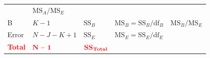 \documentclass[]{book}
\theoremstyle{definition}
\theoremstyle{definition}
\theoremstyle{remark}
\begin{document}
\begin{longtable}[]{@{}lllll@{}}
\begin{minipage}[t]{0.18\columnwidth}
\end{minipage} & \begin{minipage}[t]{0.12\columnwidth}\raggedright\strut
\(\text{MS}_A/\text{MS}_E\)\strut
\end{minipage}\tabularnewline
\begin{minipage}[t]{0.17\columnwidth}\raggedright\strut
B\strut
\end{minipage} & \begin{minipage}[t]{0.18\columnwidth}\raggedright\strut
\(K-1\)\strut
\end{minipage} & \begin{minipage}[t]{0.21\columnwidth}\raggedright\strut
\(\text{SS}_B\)\strut
\end{minipage} & \begin{minipage}[t]{0.18\columnwidth}\raggedright\strut
\(\text{MS}_B=\text{SS}_B/\text{df}_B\)\strut
\end{minipage} & \begin{minipage}[t]{0.12\columnwidth}\raggedright\strut
\(\text{MS}_B/\text{MS}_E\)\strut
\end{minipage}\tabularnewline
\begin{minipage}[t]{0.17\columnwidth}\raggedright\strut
Error\strut
\end{minipage} & \begin{minipage}[t]{0.18\columnwidth}\raggedright\strut
\(N-J-K+1\)\strut
\end{minipage} & \begin{minipage}[t]{0.21\columnwidth}\raggedright\strut
\(\text{SS}_E\)\strut
\end{minipage} & \begin{minipage}[t]{0.18\columnwidth}\raggedright\strut
\(\text{MS}_E=\text{SS}_E/\text{df}_E\)\strut
\end{minipage} & \begin{minipage}[t]{0.12\columnwidth}\raggedright\strut
\strut
\end{minipage}\tabularnewline
\begin{minipage}[t]{0.17\columnwidth}\raggedright\strut
\textcolor{red}{\textbf{Total}}\strut
\end{minipage} & \begin{minipage}[t]{0.18\columnwidth}\raggedright\strut
\(\color{red}{\mathbf{N-1}}\)\strut
\end{minipage} & \begin{minipage}[t]{0.21\columnwidth}\raggedright\strut
\(\color{red}{\textbf{SS}_{\textbf{Total}}}\)\strut
\end{minipage} & \begin{minipage}[t]{0.18\columnwidth}\raggedright\strut
\strut
\end{minipage} & \begin{minipage}[t]{0.12\columnwidth}\raggedright\strut
\strut
\end{minipage}\tabularnewline
\bottomrule
\end{longtable}
\end{document}
